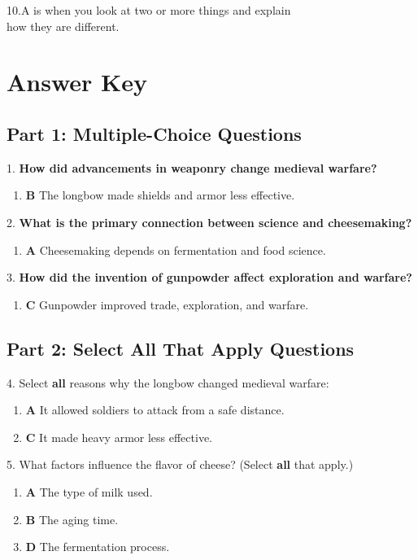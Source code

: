 \documentclass[12pt]{article}
\begin{document}
10.A \underline{\hspace{4cm}} is when you look at two or more things and explain \\how they are different.\\
\vspace{2cm}
\newpage
\section*{Answer Key}

\subsection*{Part 1: Multiple-Choice Questions}

1. \textbf{How did advancements in weaponry change medieval warfare?}
\begin{enumerate}[label=\Alph*.]
    \item \textbf{B} The longbow made shields and armor less effective.
\end{enumerate}

2. \textbf{What is the primary connection between science and cheesemaking?}
\begin{enumerate}[label=\Alph*.]
    \item \textbf{A} Cheesemaking depends on fermentation and food science.
\end{enumerate}

3. \textbf{How did the invention of gunpowder affect exploration and warfare?}
\begin{enumerate}[label=\Alph*.]
    \item \textbf{C} Gunpowder improved trade, exploration, and warfare.
\end{enumerate}

\subsection*{Part 2: Select All That Apply Questions}

4. Select \textbf{all} reasons why the longbow changed medieval warfare:
\begin{enumerate}[label=\Alph*.]
    \item \textbf{A} It allowed soldiers to attack from a safe distance.
    \item \textbf{C} It made heavy armor less effective.
\end{enumerate}

5. What factors influence the flavor of cheese? (Select \textbf{all} that apply.)
\begin{enumerate}[label=\Alph*.]
    \item \textbf{A} The type of milk used.
    \item \textbf{B} The aging time.
    \item \textbf{D} The fermentation process.
\end{enumerate}
\end{document}
